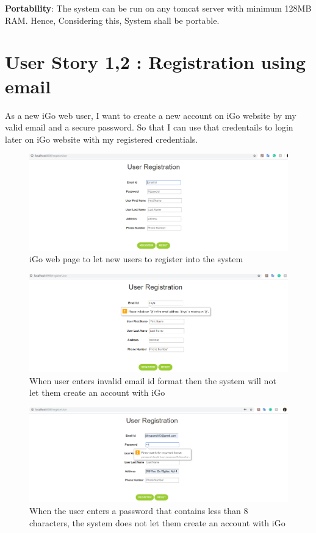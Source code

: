 \documentclass[11pt, english]{report}
\begin{document}
\begin{enumerate}
{    \item{\textbf{Portability}: The system can be run on any tomcat server with minimum 128MB RAM. Hence, Considering this, System shall be portable. }
}
\end{enumerate}


\section{User Story 1,2 : Registration using email} 
As a new iGo web user, I want to create a new account on iGo website by my valid email and a secure password. So that I can use that credentails to login later on iGo website with my registered credentials.

\begin{figure}[H]
\includegraphics[width=1\textwidth]{images/UserRegistration.PNG}
  \centering
  \caption{iGo web page to let new users to register into the system
}
\end{figure}

\begin{figure}[H]
  \includegraphics[width=1\textwidth]{images/InvalidEmail.PNG}
  \centering
  \caption{When user enters invalid email id format then the system will not let them create an account with iGo
}
\end{figure}

\begin{figure}[H]
  \includegraphics[width=1\textwidth]{images/InvalidPassword.PNG}
  \centering
  \caption{When the user enters a password that contains less than 8 characters, the system does not let them create an account with iGo
}
\end{figure}
\end{document}
